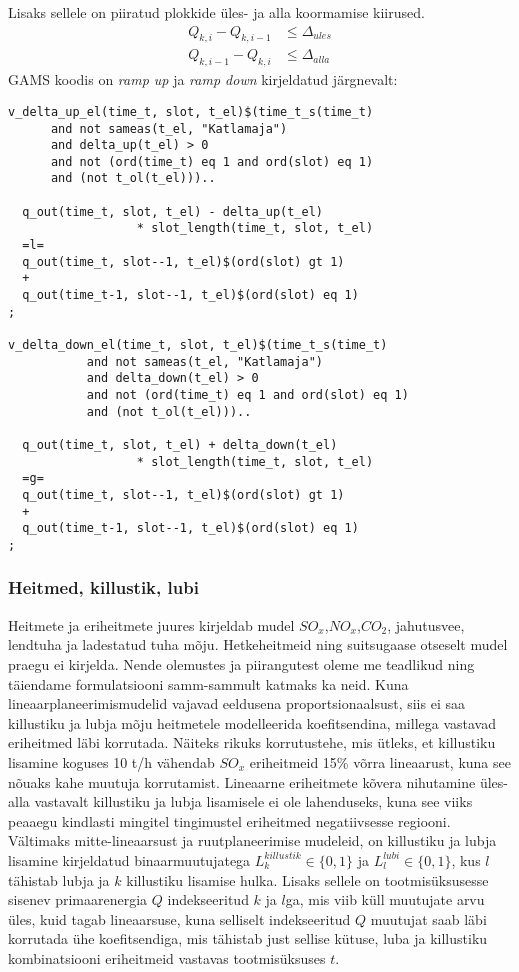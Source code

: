 \documentclass[10pt,a4paper]{article}
\begin{document}
Lisaks sellele on piiratud plokkide üles- ja alla koormamise kiirused.
\begin{align}
Q_{k,i} - Q_{k,i-1} &\leq \Delta_{ules} \\
Q_{k,i-1} - Q_{k,i} &\leq \Delta_{alla}
\end{align}
GAMS koodis on \emph{ramp up} ja \emph{ramp down} kirjeldatud järgnevalt:
\begin{verbatim}
v_delta_up_el(time_t, slot, t_el)$(time_t_s(time_t)
      and not sameas(t_el, "Katlamaja")
      and delta_up(t_el) > 0
      and not (ord(time_t) eq 1 and ord(slot) eq 1) 
      and (not t_ol(t_el)))..

  q_out(time_t, slot, t_el) - delta_up(t_el)
                  * slot_length(time_t, slot, t_el)
  =l=
  q_out(time_t, slot--1, t_el)$(ord(slot) gt 1)
  +
  q_out(time_t-1, slot--1, t_el)$(ord(slot) eq 1)
;

v_delta_down_el(time_t, slot, t_el)$(time_t_s(time_t)
           and not sameas(t_el, "Katlamaja")
           and delta_down(t_el) > 0
           and not (ord(time_t) eq 1 and ord(slot) eq 1) 
           and (not t_ol(t_el)))..

  q_out(time_t, slot, t_el) + delta_down(t_el)
                  * slot_length(time_t, slot, t_el)
  =g=
  q_out(time_t, slot--1, t_el)$(ord(slot) gt 1)
  +
  q_out(time_t-1, slot--1, t_el)$(ord(slot) eq 1)
;
\end{verbatim}

\subsubsection{Heitmed, killustik, lubi}
Heitmete ja eriheitmete juures kirjeldab mudel $SO_x$,$NO_x$,$CO_2$, jahutusvee, lendtuha ja ladestatud tuha mõju. Hetkeheitmeid ning suitsugaase otseselt mudel praegu ei kirjelda. Nende olemustes ja piirangutest oleme me teadlikud ning täiendame formulatsiooni samm-sammult katmaks ka neid. Kuna lineaarplaneerimismudelid vajavad eeldusena proportsionaalsust, siis ei saa killustiku ja lubja mõju heitmetele modelleerida koefitsendina, millega vastavad eriheitmed läbi korrutada. Näiteks rikuks korrutustehe, mis ütleks, et killustiku lisamine koguses 10 t/h vähendab $SO_x$ eriheitmeid 15\% võrra lineaarust, kuna see nõuaks kahe muutuja korrutamist. Lineaarne eriheitmete kõvera nihutamine üles-alla vastavalt killustiku ja lubja lisamisele ei ole lahenduseks, kuna see viiks peaaegu kindlasti mingitel tingimustel eriheitmed negatiivsesse regiooni. Vältimaks mitte-lineaarsust ja ruutplaneerimise mudeleid, on killustiku ja lubja lisamine kirjeldatud binaarmuutujatega $L^{killustik}_k \in \{0,1\}$ ja $L^{lubi}_l \in \{0,1\}$, kus $l$ tähistab lubja ja $k$ killustiku lisamise hulka. Lisaks sellele on tootmisüksusesse sisenev primaarenergia $Q$ indekseeritud $k$ ja $l$ga, mis viib küll muutujate arvu üles, kuid tagab lineaarsuse, kuna selliselt indekseeritud $Q$ muutujat saab läbi korrutada ühe koefitsendiga, mis tähistab just sellise kütuse, luba ja killustiku kombinatsiooni eriheitmeid vastavas tootmisüksuses $t$.
\end{document}
